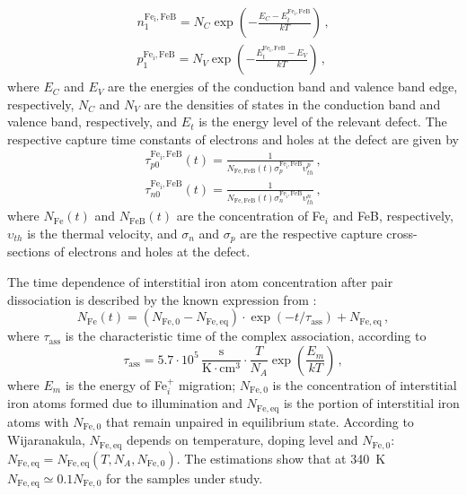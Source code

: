 \documentclass[%
 aip,jap,
 amsmath,amssymb,
 reprint,%
]{revtex4-1}
\begin{document}
\begin{eqnarray}
\label{eqp1n1}
n_1^\mathrm{Fe_i,FeB}=N_C \exp\left(-\frac{E_C-E_t^\mathrm{Fe_i,FeB}}{kT}\right)\,,\nonumber\\
p_1^\mathrm{Fe_i,FeB}=N_V \exp\left(-\frac{E_t^\mathrm{Fe_i,FeB}-E_V}{kT}\right)\,,
\end{eqnarray}
where
$E_C$ and $E_V$ are the energies of the conduction band and valence band edge, respectively,
$N_C$ and $N_V$ are the densities of states in the conduction band and valence band, respectively, and $E_t$ is the energy level of the relevant defect.
The respective capture time constants of electrons and holes at the defect are given by
\begin{eqnarray}
\label{eqtaupn}
\tau_{p0}^\mathrm{Fe_i,FeB}(t)=\frac{1}{N_\mathrm{Fe,FeB}(t)\sigma_p^\mathrm{Fe_i,FeB}\upsilon_{th}^p}\,,\nonumber\\
\tau_{n0}^\mathrm{Fe_i,FeB}(t)=\frac{1}{N_\mathrm{Fe,FeB}(t)\sigma_n^\mathrm{Fe_i,FeB}\upsilon_{th}^n}\,,
\end{eqnarray}
where
$N_\mathrm{Fe}(t)$ and $N_\mathrm{FeB}(t)$ are the concentration of Fe$_i$ and FeB, respectively,
$\upsilon_{th}$ is the thermal velocity,
and $\sigma_n$ and $\sigma_p$ are the respective capture cross-sections of electrons and holes at the defect.

The time dependence of interstitial iron atom concentration after pair dissociation is described by the known expression from \cite{MurphyJAP2011,FeB:kinetic}:
\begin{equation}
\label{eqNFet}
N_\mathrm{Fe}(t)=(N_\mathrm{Fe,0}-N_\mathrm{Fe,eq})\cdot
\exp(-t/\tau_\mathrm{ass})+N_\mathrm{Fe,eq}\,,
\end{equation}
where
$\tau_\mathrm{ass}$ is the characteristic time of the complex association,
according to \cite{FeBKin2019,FeBAssJAP2014,FeBAssSST2011}
\begin{equation}
\label{eqTass}
\tau_\mathrm{ass}=5.7\cdot10^5\,\frac{\mathrm{s}}{\mathrm{K}\cdot\mathrm{cm}^3}\cdot\frac{T}{N_A}\exp\left(\frac{E_m}{kT}\right)\,,
\end{equation}
where $E_m$ is the energy of Fe$_i^+$ migration;
$N_\mathrm{Fe,0}$ is the concentration of interstitial iron atoms formed due to illumination and $N_\mathrm{Fe,eq}$ is the portion of  interstitial iron atoms with $N_\mathrm{Fe,0}$  that remain unpaired in equilibrium state.
According to Wijaranakula\cite{FeB:kinetic},
$N_\mathrm{Fe,eq}$ depends on temperature, doping level and $N_\mathrm{Fe,0}$:
$N_\mathrm{Fe,eq}= N_\mathrm{Fe,eq}(T, N_A, N_\mathrm{Fe,0})$.
The estimations show that  at 340~K  $N_\mathrm{Fe,eq}\simeq0.1 N_\mathrm{Fe,0}$
for the samples under study.
\end{document}
